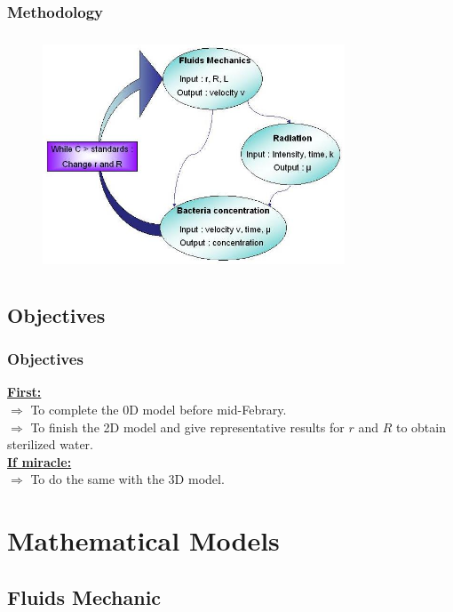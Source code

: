 \documentclass[xcolor=dvipsnames,10pt]{beamer}
\begin{document}
\begin{frame}
	\frametitle{Methodology}
	\begin{figure}
		\includegraphics[width=9cm,height=7cm]{./images/methodology2.jpg}
	\end{figure}
\end{frame}

\subsection{Objectives}
\begin{frame}
\frametitle{Objectives}
\underline{\textbf{\color{blue}First:}}\\
\vspace{5mm}
$\Rightarrow$ To complete the 0D model before mid-Febrary.\\
\vspace{4mm}
$\Rightarrow$ To finish the 2D model and give representative results for $r$ and $R$ to obtain sterilized water.\\
\vspace{8mm}
\underline{\textbf{\color{blue}If miracle:}}\\
\vspace{5mm}
$\Rightarrow$ To do the same with the 3D model.\end{frame}




\section{Mathematical Models}

\subsection{Fluids Mechanic}
\end{document}
